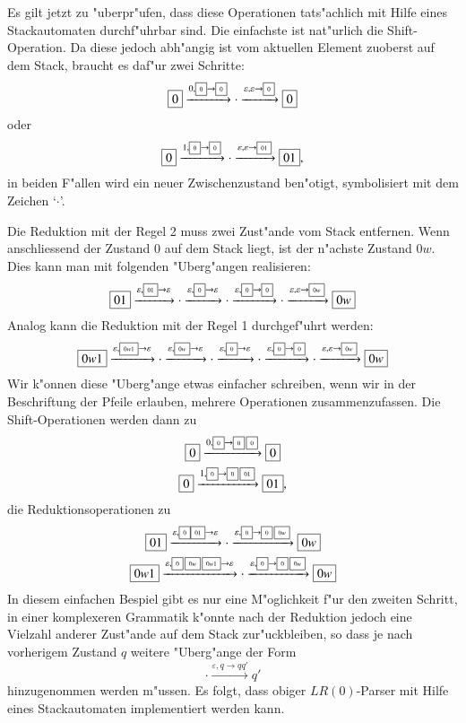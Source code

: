 Es gilt jetzt zu "uberpr"ufen, dass diese Operationen tats"achlich mit
Hilfe eines Stackautomaten durchf"uhrbar sind. Die einfachste ist nat"urlich
die Shift-Ope\-ration. Da diese jedoch abh"angig ist vom aktuellen Element zuoberst
auf dem Stack, braucht es daf"ur zwei Schritte:
\[
\boxed{0}\xrightarrow{0,{\tiny \boxed{0}\rightarrow\boxed{0}}}\cdot
\xrightarrow{\varepsilon,\varepsilon\rightarrow{\tiny \boxed{0}}}\boxed{0}
\]
oder
\[
\boxed{0}\xrightarrow{1,{\tiny \boxed{0}\rightarrow\boxed{0}}}\cdot
\xrightarrow{\varepsilon,\varepsilon\rightarrow{\tiny \boxed{01}}}\boxed{01},
\]
in beiden F"allen wird ein neuer Zwischenzustand ben"otigt, symbolisiert mit dem Zeichen
`$\cdot$'.

Die Reduktion mit der Regel 2 muss zwei Zust"ande vom Stack entfernen.
Wenn anschliessend der Zustand $\boxed{0}$ auf dem Stack liegt, ist der
n"achste Zustand $\boxed{0w}$. Dies kann man mit folgenden "Uberg"angen
realisieren:
\[
\boxed{01}
\xrightarrow{\varepsilon,{\tiny\boxed{01}}\to\varepsilon}
\cdot
\xrightarrow{\varepsilon,{\tiny\boxed{0}}\to\varepsilon}
\cdot
\xrightarrow{\varepsilon,{\tiny\boxed{0}}\to\tiny{\boxed{0}}}
\cdot
\xrightarrow{\varepsilon,{\varepsilon\to\tiny{\boxed{0w}}}}
\boxed{0w}
\]
Analog kann die Reduktion mit der Regel 1 durchgef"uhrt werden:
\[
\boxed{0w1}
\xrightarrow{\varepsilon,{\tiny\boxed{0w1}}\to\varepsilon}
\cdot
\xrightarrow{\varepsilon,{\tiny\boxed{0w}}\to\varepsilon}
\cdot
\xrightarrow{\varepsilon,{\tiny\boxed{0}}\to\varepsilon}
\cdot
\xrightarrow{\varepsilon,{\tiny\boxed{0}}\to\tiny{\boxed{0}}}
\cdot
\xrightarrow{\varepsilon,{\varepsilon\to\tiny{\boxed{0w}}}}
\boxed{0w}
\]
Wir k"onnen diese "Uberg"ange etwas einfacher schreiben, wenn wir in der
Beschriftung der Pfeile erlauben, mehrere Operationen zusammenzufassen.
Die Shift-Ope\-rationen werden dann zu
\begin{gather*}
\boxed{0}\xrightarrow{0,{\tiny \boxed{0}\rightarrow\boxed{0}\,\boxed{0}}}\boxed{0}
\\
\boxed{0}\xrightarrow{1,{\tiny \boxed{0}\rightarrow\boxed{0}\,\boxed{01}}}\boxed{01},
\end{gather*}
die Reduktionsoperationen zu
\begin{gather*}
\boxed{01}
\xrightarrow{\varepsilon,{\tiny\boxed{0}\boxed{01}}\to\varepsilon}
\cdot
\xrightarrow{\varepsilon,{\tiny\boxed{0}}\to\tiny{\boxed{0}\,\boxed{0w}}}
\boxed{0w}
\\
\boxed{0w1}
\xrightarrow{\varepsilon,{\tiny\boxed{0}\,\boxed{0w}\,\boxed{0w1}}\to\varepsilon}
\cdot
\xrightarrow{\varepsilon,{\tiny\boxed{0}}\to\tiny{\boxed{0}\,\boxed{0w}}}
\boxed{0w}
\end{gather*}
In diesem einfachen Bespiel gibt es nur eine M"oglichkeit f"ur den zweiten
Schritt, in einer komplexeren Grammatik k"onnte nach der Reduktion jedoch
eine Vielzahl anderer Zust"ande auf dem Stack zur"uckbleiben, so dass je
nach vorherigem Zustand $q$ weitere "Uberg"ange der Form
\[
\cdot\xrightarrow{\varepsilon,q\to q q'}q'
\]
hinzugenommen werden m"ussen. Es folgt, dass obiger $LR(0)$-Parser mit
Hilfe eines Stackautomaten implementiert werden kann.

